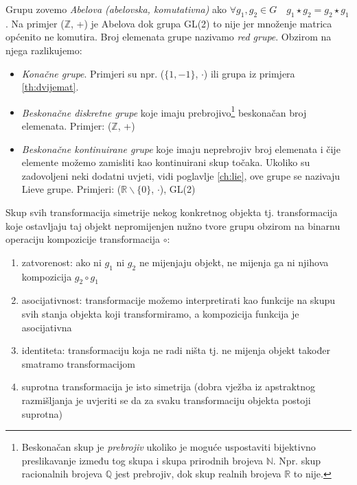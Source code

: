 Grupu zovemo \emph{Abelova (abelovska, komutativna)} ako 
$\forall g_1, g_2 \in G \quad g_1 \star g_2 = g_2 \star g_1$.
Na primjer ($\mathbb{Z}$, +) je Abelova dok grupa GL(2) to nije jer množenje
matrica općenito ne komutira.
Broj elemenata grupe nazivamo \emph{red grupe}. Obzirom na njega razlikujemo:
\begin{itemize}
\item \emph{Konačne grupe}. Primjeri su npr. ($\{1,-1\}$, $\cdot$) ili
    grupa iz primjera \ref{th:dvijemat}.
\item \emph{Beskonačne diskretne grupe} koje imaju 
prebrojivo\footnote{Beskonačan skup je \emph{prebrojiv} ukoliko je moguće uspostaviti
bijektivno preslikavanje između tog skupa i skupa prirodnih brojeva $\mathbb{N}$. Npr. skup
racionalnih brojeva $\mathbb{Q}$ jest prebrojiv, dok skup realnih brojeva
$\mathbb{R}$ to nije.}
beskonačan broj elemenata. Primjer: ($\mathbb{Z}$, +)
\item \emph{Beskonačne kontinuirane grupe} 
koje imaju neprebrojiv broj elemenata i čije elemente možemo
zamisliti kao kontinuirani skup točaka. Ukoliko su zadovoljeni neki dodatni
uvjeti, vidi poglavlje \ref{ch:lie}, ove grupe se nazivaju Lieve grupe. 
Primjeri: ($\mathbb{R}\backslash\{0\}$, $\cdot$), GL(2)
\end{itemize}

\begin{primjer}
Skup svih transformacija simetrije nekog konkretnog objekta tj. transformacija koje ostavljaju
taj objekt nepromijenjen nužno tvore grupu obzirom na binarnu
operaciju kompozicije transformacija $\circ$:
\begin{enumerate}
\item zatvorenost: ako ni $g_1$ ni $g_2$ ne mijenjaju objekt, ne mijenja
   ga ni njihova kompozicija $g_2 \circ g_1$
\item asocijativnost: transformacije možemo interpretirati kao
    funkcije na skupu svih stanja objekta koji transformiramo, a kompozicija funkcija je asocijativna
\item identiteta: transformaciju koja ne radi ništa tj. ne mijenja objekt
      također smatramo transformacijom
\item suprotna transformacija je isto simetrija (dobra vježba iz apstraktnog
    razmišljanja je uvjeriti se da za svaku transformaciju objekta postoji suprotna)
\end{enumerate}
\end{primjer}

